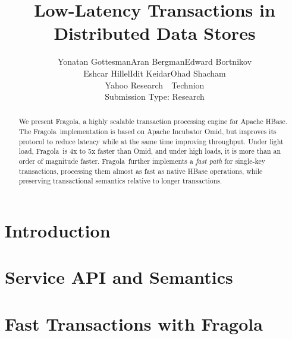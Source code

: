 \documentclass[letterpaper,twocolumn,10pt]{article}
\newcommand{\tb}{\hspace{5mm}}
\newcommand{\sys}{Fragola}
\begin{document}
\date{}

\title{Low-Latency Transactions in Distributed Data Stores}

\author{
{\rm Yonatan Gottesman\footnotemark[1]\tb Aran Bergman\footnotemark[2]\tb   Edward Bortnikov\footnotemark[1] }\\ 
{\rm Eshcar Hillel\footnotemark[1]\tb Idit Keidar\footnotemark[1] \footnotemark[2]\tb Ohad Shacham\footnotemark[1]}\\
	\footnotemark[1] Yahoo Research\ \ \footnotemark[2] Technion  \\ [2mm]
\small Submission Type: Research	
} %


\maketitle




\begin{abstract}
We present \sys, a highly scalable transaction processing engine 
for Apache HBase. 
The \sys\ implementation is based on Apache Incubator Omid, but 
improves its protocol to reduce latency 
while at the same time improving throughput.
Under light load, \sys\ is 4x to 5x faster than Omid, and under high loads, it is 
more than an order of magnitude faster. 
 \sys\ further implements a \emph{fast path} for single-key transactions,
processing them almost as fast as native HBase operations, while preserving
transactional semantics relative to longer transactions.

\end{abstract}


\section{Introduction} \label{sec:intro}
 

\section{Service API and Semantics} \label{sec:api}


\section{Fast Transactions with \sys} \label{sec:ll}


\end{document}
